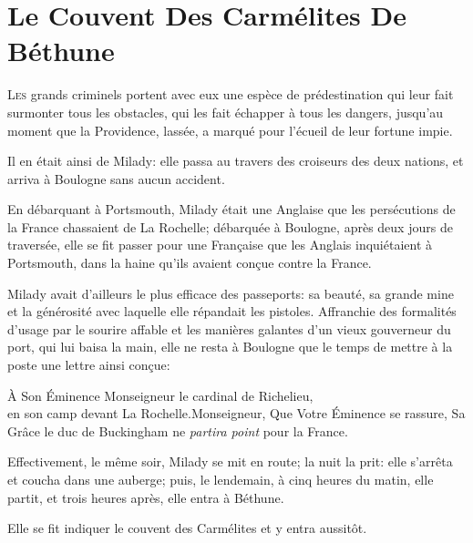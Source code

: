 
\chapter{Le Couvent Des Carmélites De Béthune}

\lettrine{L}{es} grands criminels portent avec eux une espèce de prédestination qui leur fait surmonter tous les obstacles, qui les fait échapper à tous les dangers, jusqu'au moment que la Providence, lassée, a marqué pour l'écueil de leur fortune impie. 

Il en était ainsi de Milady: elle passa au travers des croiseurs des deux nations, et arriva à Boulogne sans aucun accident. 

En débarquant à Portsmouth, Milady était une Anglaise que les persécutions de la France chassaient de La Rochelle; débarquée à Boulogne, après deux jours de traversée, elle se fit passer pour une Française que les Anglais inquiétaient à Portsmouth, dans la haine qu'ils avaient conçue contre la France. 

Milady avait d'ailleurs le plus efficace des passeports: sa beauté, sa grande mine et la générosité avec laquelle elle répandait les pistoles. Affranchie des formalités d'usage par le sourire affable et les manières galantes d'un vieux gouverneur du port, qui lui baisa la main, elle ne resta à Boulogne que le temps de mettre à la poste une lettre ainsi conçue: 

\begin{a4}
	\clearpage
\end{a4}

\begin{mail}{À Son Éminence Monseigneur le cardinal de Richelieu,\\ en son camp devant La Rochelle.}{Monseigneur,} 
Que Votre Éminence se rassure, Sa Grâce le duc de Buckingham ne \textit{partira point} pour la France.	
\end{mail}

Effectivement, le même soir, Milady se mit en route; la nuit la prit: elle s'arrêta et coucha dans une auberge; puis, le lendemain, à cinq heures du matin, elle partit, et trois heures après, elle entra à Béthune. 

Elle se fit indiquer le couvent des Carmélites et y entra aussitôt. 

